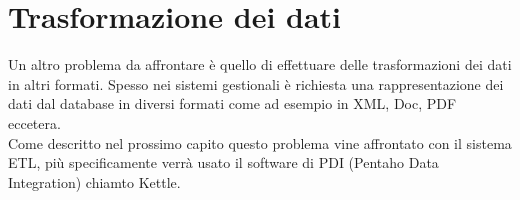 \section{Trasformazione dei dati}
Un altro problema da affrontare è quello di effettuare delle trasformazioni dei dati in altri formati. Spesso nei sistemi gestionali è richiesta una rappresentazione dei dati dal database in diversi formati come ad esempio in XML, Doc, PDF eccetera.  \\
Come descritto nel prossimo capito questo problema vine affrontato con il sistema ETL, più specificamente verrà usato il software di PDI (Pentaho Data Integration) chiamto Kettle.






































